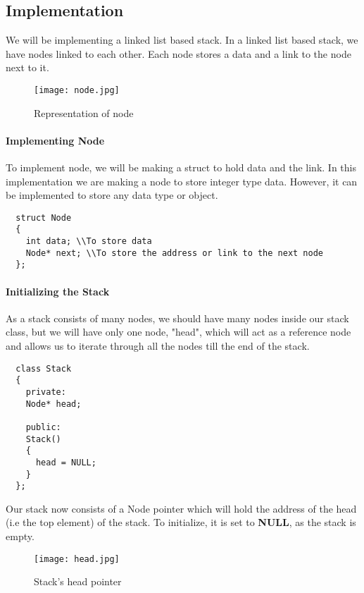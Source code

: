 \documentclass[11pt,fleqn]{book} %
\begin{document}
\subsection{Implementation}
We will be implementing a linked list based stack. In a linked list based stack, we have nodes linked to each other.
Each node stores a data and a link to the node next to it.
\begin{figure}[H]
  \centering
  \texttt{[image: node.jpg]}
  \caption{Representation of node}
\end{figure}
\paragraph{Implementing Node}
To implement node, we will be making a struct to hold data and the link. In this implementation we are making a node to store integer type data. However, it can be implemented to store any data type or object.
\begin{lstlisting}
  struct Node
  {
    int data; \\To store data
    Node* next; \\To store the address or link to the next node
  };
\end{lstlisting}
\newpage
\paragraph{Initializing the Stack}
As a stack consists of many nodes, we should have many nodes inside our stack class, but we will have only one node, "head", which will act as a reference node and allows us to iterate through all the nodes till the end of the stack.

\begin{lstlisting}
  class Stack
  {
    private:
    Node* head;
    
    public:
    Stack()
    {
      head = NULL;
    }
  };		

\end{lstlisting}
Our stack now consists of a Node pointer which will hold the address of the head (i.e the top element) of the stack. To initialize, it is set to \textbf{NULL}, as the stack is empty.
\begin{figure}[H]
  \centering
  \texttt{[image: head.jpg]}
  \caption{Stack's head pointer}
\end{figure}
\end{document}
